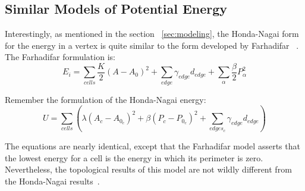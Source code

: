 \subsection{Similar Models of Potential Energy}
Interestingly, as mentioned in the section ~\ref{sec:modeling}, the Honda-Nagai form for the energy in a vertex is quite similar to the form developed by Farhadifar ~\cite{Farhadifar}. The Farhadifar formulation is:
\begin{equation}
E_i = \sum\limits_{cells}\frac K2(A - A_0)^2 + \sum\limits_{edge}\gamma_{edge}d_{edge} + \sum\limits_{\alpha}\frac\beta2P_\alpha^2
\end{equation}

Remember the formulation of the Honda-Nagai energy:
\begin{equation*}
U = \sum\limits_{cells}\left(\lambda(A_c - A_{0_c})^2 + \beta(P_c - P_{0_c})^2 + \sum_{edges_c}\gamma_{edge}d_{edge}\right)
\end{equation*}

The equations are nearly identical, except that the Farhadifar model asserts that the lowest energy for a cell is the energy in which its perimeter is zero. Nevertheless, the topological results of this model are not wildly different from the Honda-Nagai results~\cite{Farhadifar}.

